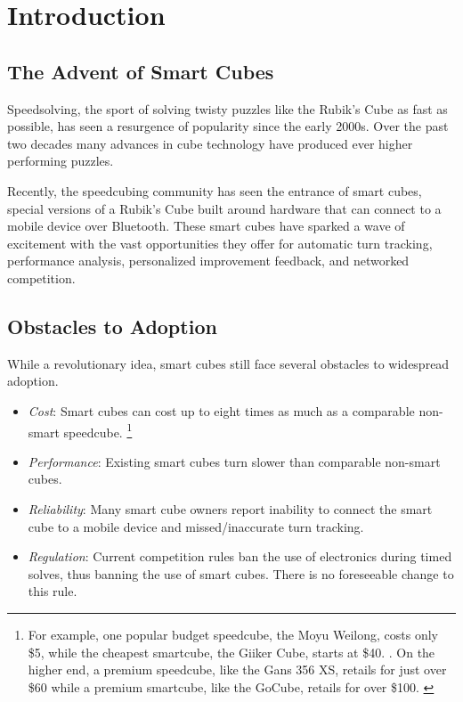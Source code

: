 
\chapter{Introduction} %

\label{Chapter1} %



\section{The Advent of Smart Cubes}
Speedsolving, the sport of solving twisty puzzles like the Rubik’s Cube as fast as possible, has seen a resurgence of popularity since the early 2000s. \cite{TODO}
Over the past two decades many advances in cube technology have produced ever higher performing puzzles. 

Recently, the speedcubing community has seen the entrance of smart cubes, special versions of a Rubik’s Cube built around hardware that can connect to a mobile device over Bluetooth. 
These smart cubes have sparked a wave of excitement with the vast opportunities they offer for automatic turn tracking, performance analysis, personalized improvement feedback, and networked competition.

\section{Obstacles to Adoption}
While a revolutionary idea, smart cubes still face several obstacles to widespread adoption. 

\begin{itemize}
    \item \emph{Cost}: Smart cubes can cost up to eight times as much as a comparable non-smart speedcube. \footnote{For example, one popular budget speedcube, the Moyu Weilong, costs only \$5, while the cheapest smartcube, the Giiker Cube, starts at \$40. \cite{TODO}. On the higher end, a premium speedcube, like the Gans 356 XS, retails for just over \$60 while a premium smartcube, like the GoCube, retails for over \$100. \cite{TODO}}
    \item \emph{Performance}: Existing smart cubes turn slower than comparable non-smart cubes. \cite{TODO}
    \item \emph{Reliability}: Many smart cube owners report inability to connect the smart cube to a mobile device and missed/inaccurate turn tracking. \cite{TODO}
    \item \emph{Regulation}: Current competition rules ban the use of electronics during timed solves, thus banning the use of smart cubes. There is no foreseeable change to this rule. \cite{TODO} %
\end{itemize}

